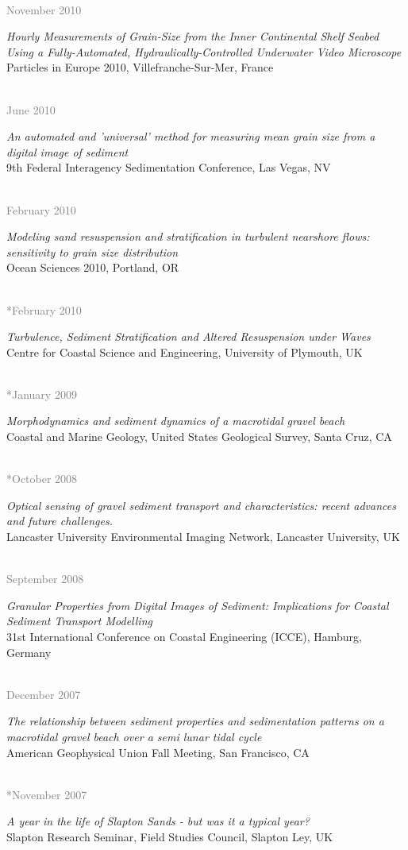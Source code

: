 \documentclass{article} %
\newlength\sidebarwidth
\newcommand{\dateonly}[2][]
	 {\begin{minipage}{\textwidth}
	 \vspace*{.4\baselineskip}
         \nopagebreak\hspace{0in}%
         \nopagebreak\begin{minipage}[t]{\sidebarwidth - .2cm}
         \raggedleft {~}
         {\\[-\baselineskip] \textcolor{gray}{\footnotesize #1}}
	 \end{minipage}%
	 \hfill
	 \begin{minipage}[t]{\linewidth - \sidebarwidth}
	 #2%
	 \end{minipage}%
	 \vspace*{.2\baselineskip plus 1\baselineskip minus
	 .2\baselineskip}%
	 \end{minipage}}
\begin{document}
  \dateonly[November 2010]{
      {\it Hourly Measurements of Grain-Size from the Inner Continental Shelf Seabed Using a Fully-Automated, Hydraulically-Controlled Underwater Video Microscope}\\
      Particles in Europe 2010, Villefranche-Sur-Mer, France
  }

  \dateonly[June 2010]{
      {\it An automated and 'universal' method for measuring mean grain size from a digital image of sediment}\\
      9th Federal Interagency Sedimentation Conference, Las Vegas, NV
  }

  \dateonly[February 2010]{
      {\it Modeling sand resuspension and stratification in turbulent nearshore flows: sensitivity to grain size distribution}\\
      Ocean Sciences 2010, Portland, OR
    }

  \dateonly[**February 2010]{
      {\it Turbulence, Sediment Stratification and Altered Resuspension under Waves}\\
      Centre for Coastal Science and Engineering, University of Plymouth, UK
    }

  \dateonly[**January 2009]{
    {\it Morphodynamics and sediment dynamics of a macrotidal gravel beach}\\
    Coastal and Marine Geology, United States Geological Survey, Santa Cruz, CA
  }

  \dateonly[**October 2008]{
    {\it Optical sensing of gravel sediment transport and characteristics: recent advances and future challenges.}\\
    Lancaster University Environmental Imaging Network, Lancaster University, UK
  }

  \dateonly[September 2008]{
      {\it Granular Properties from Digital Images of Sediment: Implications for Coastal Sediment Transport Modelling}\\
      31st International Conference on Coastal Engineering (ICCE), Hamburg, Germany
  }

  \dateonly[December 2007]{
      {\it The relationship between sediment properties and sedimentation patterns on a macrotidal gravel beach over a semi lunar tidal cycle}\\
      American Geophysical Union Fall Meeting, San Francisco, CA
  }

  \dateonly[**November 2007]{
    {\it A year in the life of Slapton Sands - but was it a typical year?}\\
    Slapton Research Seminar, Field Studies Council, Slapton Ley, UK
  }
\end{document}

